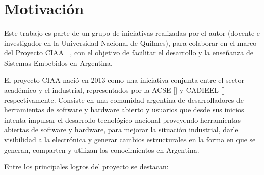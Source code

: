 \section{Motivación}
\label{sec:motivacion}

Este trabajo es parte de un grupo de iniciativas realizadas por el autor (docente e investigador en la Universidad Nacional de Quilmes), para colaborar en el marco del Proyecto CIAA [], con el objetivo de facilitar el desarrollo y la enseñanza de Sistemas Embebidos en Argentina.

El proyecto CIAA nació en 2013 como una iniciativa conjunta entre el sector académico y el industrial, representados por la ACSE [] y CADIEEL [] respectivamente. Consiste en una comunidad argentina de desarrolladores de herramientas de software y hardware abierto y usuarios que desde sus inicios intenta impulsar el desarrollo tecnológico nacional proveyendo herramientas abiertas de software y hardware, para mejorar la situación industrial, darle visibilidad a la electrónica y generar cambios estructurales en la forma en que se generan, comparten y utilizan los conocimientos en Argentina.


Entre los principales logros del proyecto se destacan:

